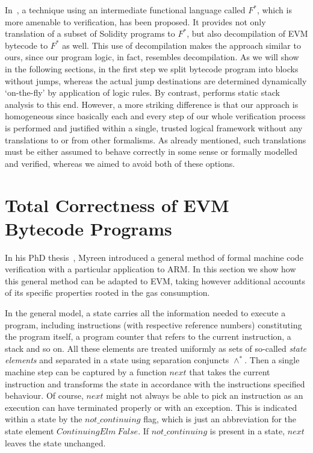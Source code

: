 \documentclass[sigplan,10pt,review]{acmart}\settopmatter{printfolios=true,printccs=false,printacmref=false}
\newcommand{\sconj}{\wedge^*}
\newcommand{\xnext}{\mathit{next}}
\newcommand{\ncont}{\mathit{not\_continuing}}
\begin{document}
In~\cite{Bhargavan:2016:FVS:2993600.2993611}, a technique using an intermediate functional language
called $F^*$, which is more amenable to verification, has been proposed. 
It provides not only translation of a subset of Solidity programs 
to $F^*$, but also decompilation of EVM bytecode to $F^*$ as well. This use of decompilation makes
the approach similar to ours, since our program logic, in fact, resembles decompilation.
As we will show in the following sections, in the first step we split bytecode program into blocks without jumps,  
whereas the actual jump destinations are determined dynamically `on-the-fly' by application of logic rules.
By contrast, \cite{Bhargavan:2016:FVS:2993600.2993611} performs static stack analysis to this end.
However, a more striking difference is that our approach is homogeneous since basically each and every step of our whole verification process 
is performed and justified within a single, trusted logical framework without any translations to or from other formalisms.
As already mentioned, such translations must be either assumed to behave correctly in some sense or 
formally modelled and verified,
whereas we aimed to avoid both of these options. 
%   
\section{Total Correctness of EVM Bytecode Programs}
\label{sec:corr}
In his PhD thesis~\cite{DBLP:phd/ethos/Myreen09}, Myreen introduced a general 
method of formal 
machine code verification with a particular application to ARM. In this section we show how
this general method can be adapted to EVM, taking however additional accounts of its specific properties rooted in the 
gas consumption.
 
In the general model, a state carries all the information needed to execute a program, including
instructions (with respective reference numbers) constituting the program itself, a program counter that
refers to the current instruction, a stack and so on. All these elements are treated uniformly 
as sets of so-called \emph{state elements}
and separated in a state using separation conjuncts $\sconj$.  
Then a single machine step can be captured by a function $\xnext$ that 
takes the current instruction and transforms the state in accordance with the instructions
specified behaviour. Of course, $\xnext$ might not always be able to pick an instruction
as an execution can have terminated properly or with an exception. This is indicated within a state
by the $\ncont$ flag, which is just an abbreviation for the state element 
$\mathit{ContinuingElm}\:False$. If $\ncont$ is present in a state, $\xnext$
leaves the state unchanged.   
   
\end{document}
